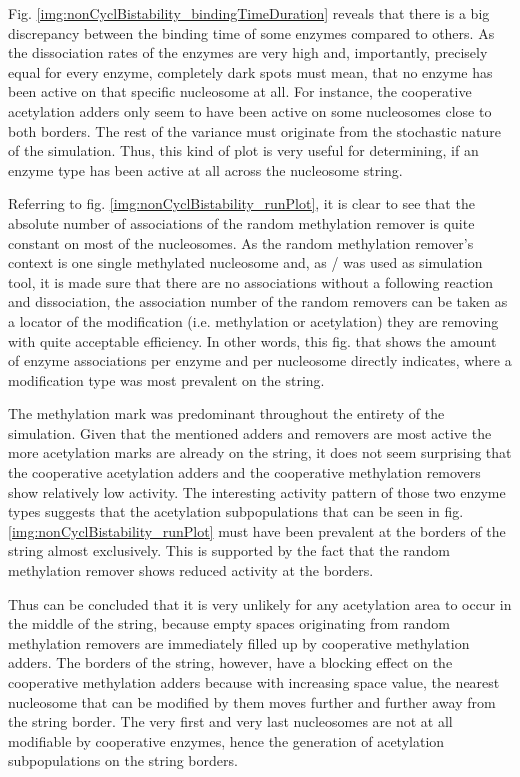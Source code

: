             Fig. \ref{img:nonCyclBistability_bindingTimeDuration} reveals that there is a big discrepancy between the binding time of some enzymes compared to others. As the dissociation rates of the enzymes are very high and, importantly, precisely equal for every enzyme, completely dark spots must mean, that no enzyme has been active on that specific nucleosome at all. For instance, the cooperative acetylation adders only seem to have been active on some nucleosomes close to both borders. The rest of the variance must originate from the stochastic nature of the simulation. Thus, this kind of plot is very useful for determining, if an enzyme type has been active at all across the nucleosome string.

            Referring to fig. \ref{img:nonCyclBistability_runPlot}, it is clear to see that the absolute number of associations of the random methylation remover is quite constant on most of the nucleosomes. As the random methylation remover's context is one single methylated nucleosome and, as \ed/ was used as simulation tool, it is made sure that there are no associations without a following reaction and dissociation, the association number of the random removers can be taken as a locator of the modification (i.e. methylation or acetylation) they are removing with quite acceptable efficiency. In other words, this fig. that shows the amount of enzyme associations per enzyme and per nucleosome directly indicates, where a modification type was most prevalent on the string.

            The methylation mark was predominant throughout the entirety of the simulation. Given that the mentioned adders and removers are most active the more acetylation marks are already on the string, it does not seem surprising that the cooperative acetylation adders and the cooperative methylation removers show relatively low activity. The interesting activity pattern of those two enzyme types suggests that the acetylation subpopulations that can be seen in fig. \ref{img:nonCyclBistability_runPlot} must have been prevalent at the borders of the string almost exclusively. This is supported by the fact that the random methylation remover shows reduced activity at the borders.

            Thus can be concluded that it is very unlikely for any acetylation area to occur in the middle of the string, because empty spaces originating from random methylation removers are immediately filled up by cooperative methylation adders. The borders of the string, however, have a blocking effect on the cooperative methylation adders because with increasing space value, the nearest nucleosome that can be modified by them moves further and further away from the string border. The very first and very last nucleosomes are not at all modifiable by cooperative enzymes, hence the generation of acetylation subpopulations on the string borders.
